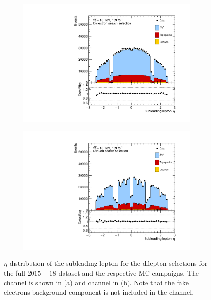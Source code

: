 \begin{figure}[]
    \centering
    \begin{subfigure}[b]{0.49\textwidth}
        \centering
        \includegraphics[width=\textwidth]{figures/analysis/datamc/dataMCcompare/ee_eta2.pdf}
        \caption{}
        \label{fig:datamc:eeeta2}
    \end{subfigure}
    \begin{subfigure}[b]{0.49\textwidth}
        \centering
        \includegraphics[width=\textwidth]{figures/analysis/datamc/dataMCcompare/uu_eta2.pdf}
        \caption{}
        \label{fig:datamc:uueta2}
    \end{subfigure}
    \caption[$\eta$ distribution of the subleading lepton for the dilepton selections for the full $2015-18$ dataset and the respective MC campaigns.]{$\eta$ distribution of the subleading lepton for the dilepton selections for the full $2015-18$ dataset and the respective MC campaigns. The \ee channel is shown in (a) and \mumu channel in (b). Note that the fake electrons background component is not included in the \ee channel.}
    \label{fig:datamc:eta2}
\end{figure}
